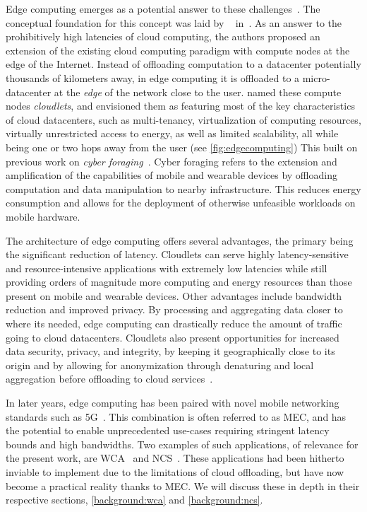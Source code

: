\medskip
Edge computing emerges as a potential answer to these challenges~\cite{satyanarayanan2009case,shi2016promise,shi2016edge,varghese2016challenges,satyanarayanan2017emergence,bittmann2017edge,wang2019towards}.
The conceptual foundation for this concept was laid by \citeauthor{satyanarayanan2009case}~\cite{satyanarayanan2009case} in\ \citeyear{satyanarayanan2009case}.
As an answer to the prohibitively high latencies of cloud computing, the authors proposed an extension of the existing cloud computing paradigm with compute nodes at the edge of the Internet.
Instead of offloading computation to a datacenter potentially thousands of kilometers away, in edge computing it is offloaded to a micro-datacenter at the \emph{edge} of the network close to the user.
\citeauthor{satyanarayanan2009case} named these compute nodes \emph{cloudlets}, and envisioned them as featuring most of the key characteristics of cloud datacenters, such as multi-tenancy, virtualization of computing resources, virtually unrestricted access to energy, as well as limited scalability, all while being one or two hops away from the user (see \cref{fig:edgecomputing})
This built on previous work on \emph{cyber foraging}~\cite{noble1997agile,flinn1999energy,satyanarayanan2001pervasive}.
Cyber foraging refers to the extension and amplification of the capabilities of mobile and wearable devices by offloading computation and data manipulation to nearby infrastructure.
This reduces energy consumption and allows for the deployment of otherwise unfeasible workloads on mobile hardware.

The architecture of edge computing offers several advantages, the primary being the significant reduction of latency.
Cloudlets can serve highly latency-sensitive and resource-intensive applications with extremely low latencies while still providing orders of magnitude more computing and energy resources than those present on mobile and wearable devices.
Other advantages include bandwidth reduction and improved privacy.
By processing and aggregating data closer to where its needed, edge computing can drastically reduce the amount of traffic going to cloud datacenters.
Cloudlets also present opportunities for increased data security, privacy, and integrity, by keeping it geographically close to its origin and by allowing for anonymization through denaturing and local aggregation before offloading to cloud services~\cite{satyanarayanan2017emergence}.

In later years, edge computing has been paired with novel mobile networking standards such as 5G~\cite{hassan2019edge,pham2020survey,wan2020efficient}.
This combination is often referred to as \gls{MEC}, and has the potential to enable unprecedented use-cases requiring stringent latency bounds and high bandwidths.
Two examples of such applications, of relevance for the present work, are \acl{WCA}~\cite{ha2014towards,chen2018application,wang2020scaling,chen2017empirical,chen2018application} and \acl{NCS}~\cite{sasaki2016vehicle,wang2018bandwidth,wan2020efficient}.
These applications had been hitherto inviable to implement due to the limitations of cloud offloading, but have now become a practical reality thanks to \gls{MEC}.
We will discuss these in depth in their respective sections, \cref{background:wca} and \cref{background:ncs}.

